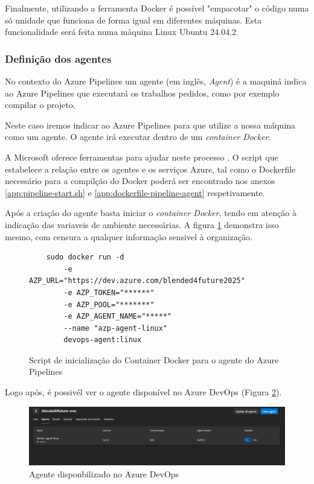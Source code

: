 Finalmente, utilizando a ferramenta Docker é possível "empacotar" o código numa só unidade que funciona de forma igual em diferentes máquinas. Esta funcionalidade será feita numa màquina Linux Ubuntu 24.04.2. 

\subsubsection{Definição dos agentes}

No contexto do Azure Pipelines um agente (em inglês, \textit{Agent}) é a maquiná indica ao Azure Pipelines que executará os trabalhos pedidos, como por exemplo compilar o projeto. 

Neste caso iremos indicar ao Azure Pipelines para que utilize a nossa máquina como um agente. O agente irá executar dentro de um \textit{container Docker}.

A Microsoft oferece ferramentas para ajudar neste processo \cite{run-a-self-hosted-agent-in-docker}. O script que estabelece a relação entre os agentes e os serviços Azure, tal como o Dockerfile necessário para a compilção do Docker poderá ser encontrado nos anexos \ref{app:pipeline-start.sh} e \ref{app:dockerfile-pipeline-agent} respetivamente.

Após a criação do agente basta iniciar o \textit{container Docker}, tendo em atenção à indicação das variaveis de ambiente necessárias. A figura \ref{fig:start-docker-agent} demonstra isso mesmo, com censura a qualquer informação sensivel à organização.

\begin{figure}
    

\begin{lstlisting}
    sudo docker run -d 
        -e AZP_URL="https://dev.azure.com/blended4future2025" 
        -e AZP_TOKEN="******" 
        -e AZP_POOL="*******" 
        -e AZP_AGENT_NAME="*****" 
        --name "azp-agent-linux" 
        devops-agent:linux
\end{lstlisting}


\caption{Script de inicialização do Container Docker para o agente do Azure Pipelines}
\label{fig:start-docker-agent}

\end{figure}

Logo após, é possivél ver o agente disponível no Azure DevOps (Figura \ref{fig:agent-devops}). 

\begin{figure}
\includegraphics[width=\linewidth]{capitulos/cap4-implementacao/assets/devops-agent.png}
\caption{Agente disponbilizado no Azure DevOps}
\label{fig:agent-devops}
\end{figure}

